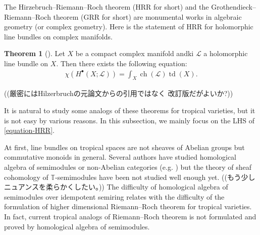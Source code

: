 \documentclass[a4paper,dvipdfmx,reqno,12pt]{amsart}
\theoremstyle{definition}
\newtheorem{Thm}{Theorem}[section]
\newcommand{\opn}[1]{\operatorname{#1}}
\numberwithin{equation}{section}
\begin{document}
The Hirzebruch--Riemann--Roch theorem (HRR for short) and the Grothendieck--
Riemann--Roch theorem (GRR for short) 
are monumental works in
algebraic geometry (or complex geometry). 
Here is the statement of HRR for holomorphic line bundles on 
complex manifolds.
\begin{Thm}[{\cite{MR0202713}}]
Let $X$ be a compact complex manifold andki
$\mathcal{L}$ a holomorphic line bundle on $X$.
Then there exists the following equation:
\begin{align} \label{equation-HRR}
\chi(H^{\bullet}(X;\mathcal{L}))
=\int_X \opn{ch}(\mathcal{L})\opn{td}(X).
\end{align}
\end{Thm}

((厳密にはHilzerbruchの元論文からの引用ではなく
改訂版だがよいか?))

It is natural to study some analogs of these theorems 
for tropical varieties, but it is not easy by various
reasons.
In this subsection, we mainly focus on the 
LHS of \cref{equation-HRR}.

At first, line bundles on tropical spaces are not sheaves of 
Abelian groups but commutative monoids in general.
Several authors have studied homological algebra of semimodules 
or non-Abelian categories (e.g. 
\cite{MR3051517,MR3211743,https://doi.org/10.48550/arxiv.2202.01573})
but the theory of sheaf cohomology of $\mathbb{T}$-semimodules 
have been not studied well enough yet.
((もう少しニュアンスを柔らかくしたい。))
The difficulty of homological algebra of semimodules
over idempotent semiring relates 
with the difficulty of the formulation of
higher dimensional
Riemann--Roch theorem for tropical varieties.
In fact, current tropical analogs of Riemann--Roch 
theorem is not formulated and proved by 
homological algebra of semimodules.
\end{document}
